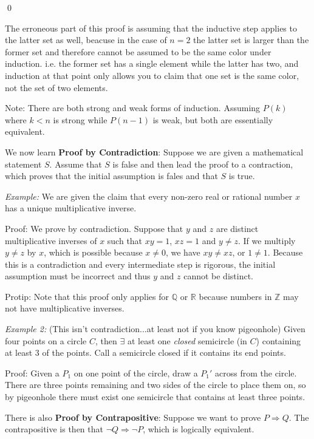 \documentclass{report}
\begin{document}
\qed

The erroneous part of this proof is assuming that the inductive step applies to the latter set as well, beacuse in the case of $n = 2$ the latter set is larger than the former set and therefore cannot be assumed to be the same color under induction. i.e. the former set has a single element while the latter has two, and induction at that point only allows you to claim that one set is the same color, not the set of two elements.

Note: There are both strong and weak forms of induction. Assuming $P(k)$ where $k < n$ is strong while $P(n-1)$ is weak, but both are essentially equivalent.

We now learn \textbf{Proof by Contradiction}: Suppose we are given a mathematical statement $S$. Assume that $S$ is false and then lead the proof to a contraction, which proves that the initial assumption is fales and that $S$ is true.

\emph{Example:} We are given the claim that every non-zero real or rational number $x$ has a unique multiplicative inverse. 

Proof: We prove by contradiction. Suppose that $y$ and $z$ are distinct multiplicative inverses of $x$ such that $xy = 1$, $xz = 1$ and $y \neq z$. If we multiply $y \neq z$ by $x$, which is possible because $x \neq 0$, we have $xy \neq xz$, or $1 \neq 1$. Because this is a contradiction and every intermediate step is rigorous, the initial assumption must be incorrect and thus $y$ and $z$ cannot be distinct.

Protip: Note that this proof only applies for $\mathbb{Q}$ or $\mathbb{R}$ because numbers in $\mathbb{Z}$ may not have multiplicative inverses. 

\emph{Example 2:} (This isn't contradiction...at least not if you know pigeonhole) Given four points on a circle $C$, then $\exists$ at least one \emph{closed} semicircle (in $C$) containing at least $3$ of the points. Call a semicircle closed if it contains its end points. 

Proof: Given a $P_1$ on one point of the circle, draw a $P_1'$ across from the circle. There are three points remaining and two sides of the circle to place them on, so by pigeonhole there must exist one semicircle that contains at least three points.

There is also \textbf{Proof by Contrapositive}: Suppose we want to prove $P \Rightarrow Q$. The contrapositive is then that $\neg Q \Rightarrow \neg P$, which is logically equivalent.
\end{document}
